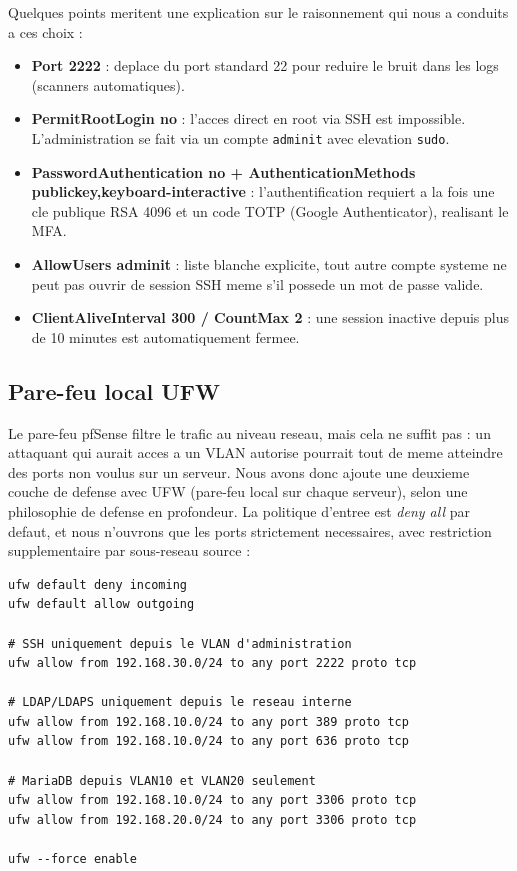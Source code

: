 \documentclass[11pt,a4paper]{article}
\begin{document}
Quelques points meritent une explication sur le raisonnement qui nous a conduits a ces choix :
\begin{itemize}[leftmargin=1.4em]
  \item \textbf{Port 2222} : deplace du port standard 22 pour reduire le bruit dans les logs (scanners automatiques).
  \item \textbf{PermitRootLogin no} : l'acces direct en root via SSH est impossible. L'administration se fait via un compte \texttt{adminit} avec elevation \texttt{sudo}.
  \item \textbf{PasswordAuthentication no + AuthenticationMethods publickey,keyboard-interactive} : l'authentification requiert a la fois une cle publique RSA 4096 et un code TOTP (Google Authenticator), realisant le MFA.
  \item \textbf{AllowUsers adminit} : liste blanche explicite, tout autre compte systeme ne peut pas ouvrir de session SSH meme s'il possede un mot de passe valide.
  \item \textbf{ClientAliveInterval 300 / CountMax 2} : une session inactive depuis plus de 10 minutes est automatiquement fermee.
\end{itemize}

\subsection{Pare-feu local UFW}

Le pare-feu pfSense filtre le trafic au niveau reseau, mais cela ne suffit pas : un attaquant qui aurait acces a un VLAN autorise pourrait tout de meme atteindre des ports non voulus sur un serveur. Nous avons donc ajoute une deuxieme couche de defense avec UFW (pare-feu local sur chaque serveur), selon une philosophie de defense en profondeur. La politique d'entree est \emph{deny all} par defaut, et nous n'ouvrons que les ports strictement necessaires, avec restriction supplementaire par sous-reseau source :

\begin{lstlisting}[caption={Regles UFW appliquees sur le serveur AD-LDAP}]
ufw default deny incoming
ufw default allow outgoing

# SSH uniquement depuis le VLAN d'administration
ufw allow from 192.168.30.0/24 to any port 2222 proto tcp

# LDAP/LDAPS uniquement depuis le reseau interne
ufw allow from 192.168.10.0/24 to any port 389 proto tcp
ufw allow from 192.168.10.0/24 to any port 636 proto tcp

# MariaDB depuis VLAN10 et VLAN20 seulement
ufw allow from 192.168.10.0/24 to any port 3306 proto tcp
ufw allow from 192.168.20.0/24 to any port 3306 proto tcp

ufw --force enable
\end{lstlisting}
\end{document}

